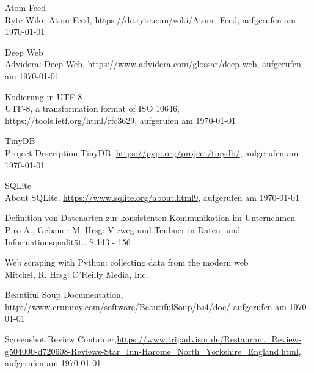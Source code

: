 \documentclass[a4paper,oneside,12pt]{report}
\begin{document}
	\clearpage
	\begin{thebibliography}{9} 
		\vspace{1.0cm}
		
		 Atom Feed\\ Ryte Wiki: Atom Feed, \newline \url{https://de.ryte.com/wiki/Atom_Feed}, aufgerufen am \today
					
		 Deep Web\\ Advidera: Deep Web, \newline \url{https://www.advidera.com/glossar/deep-web}, aufgerufen am \today	
		
		 Kodierung in UTF-8\\ UTF-8, a transformation format of ISO 10646, \newline \url{https://tools.ietf.org/html/rfc3629}, aufgerufen am \today
		
		 TinyDB\\ Project Description TinyDB, \newline \url{https://pypi.org/project/tinydb/}, aufgerufen am \today
		
		 SQLite\\ About SQLite, \newline \url{https://www.sqlite.org/about.html9}, aufgerufen am \today
		
		 Definition von Datenarten zur konsistenten Kommunikation im Unternehmen\\ Piro A., Gebauer M. Hrsg: \glqq Vieweg und Teubner in Daten- und Informationsqualität.\grqq, S.143 - 156
		
		 Web scraping with Python: collecting data from the modern web\\ Mitchel, R. Hrsg: \O'Reilly Media, Inc.
		
		 Beautiful Soup Documentation, \newline \url{http://www.crummy.com/software/BeautifulSoup/bs4/doc/} aufgerufen am \today
		
		 Screenshot Review Container,\newline \url{https://www.tripadvisor.de/Restaurant_Review-g504000-d720608-Reviews-Star_Inn-Harome_North_Yorkshire_England.html}, aufgerufen am \today
		
	\end{thebibliography}
	
\end{document}
